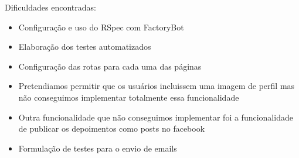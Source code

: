 \documentclass[12pt,a4paper]{article}
\begin{document}
\noindent Dificuldades encontradas:
\begin{itemize}
	\item Configuração e uso do RSpec com FactoryBot
	\item Elaboração dos testes automatizados
	\item Configuração das rotas para cada uma das páginas
	\item Pretendiamos permitir que os usuários incluissem uma imagem de perfil mas não conseguimos implementar totalmente essa funcionalidade
	\item Outra funcionalidade que não conseguimos implementar foi a funcionalidade de publicar os depoimentos como posts no facebook
	\item Formulação de testes para o envio de emails
\end{itemize}
\end{document}
